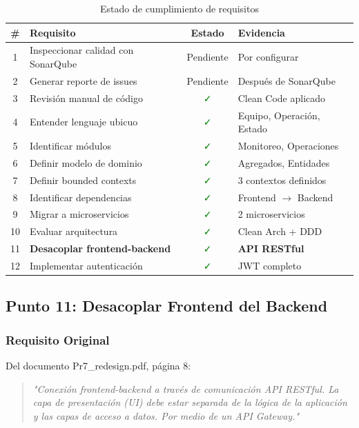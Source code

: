 \documentclass[12pt,a4paper]{article}
\begin{document}
\begin{table}[H]
\centering
\small
\begin{tabular}{|c|p{7cm}|c|p{4cm}|}
\hline
\textbf{\#} & \textbf{Requisito} & \textbf{Estado} & \textbf{Evidencia} \\
\hline
1 & Inspeccionar calidad con SonarQube & Pendiente & Por configurar \\
\hline
2 & Generar reporte de issues & Pendiente & Después de SonarQube \\
\hline
3 & Revisión manual de código & \textcolor{green}{✓} & Clean Code aplicado \\
\hline
4 & Entender lenguaje ubicuo & \textcolor{green}{✓} & Equipo, Operación, Estado \\
\hline
5 & Identificar módulos & \textcolor{green}{✓} & Monitoreo, Operaciones \\
\hline
6 & Definir modelo de dominio & \textcolor{green}{✓} & Agregados, Entidades \\
\hline
7 & Definir bounded contexts & \textcolor{green}{✓} & 3 contextos definidos \\
\hline
8 & Identificar dependencias & \textcolor{green}{✓} & Frontend $\rightarrow$ Backend \\
\hline
9 & Migrar a microservicios & \textcolor{green}{✓} & 2 microservicios \\
\hline
10 & Evaluar arquitectura & \textcolor{green}{✓} & Clean Arch + DDD \\
\hline
11 & \textbf{Desacoplar frontend-backend} & \textcolor{green}{✓} & \textbf{API RESTful} \\
\hline
12 & Implementar autenticación & \textcolor{green}{✓} & JWT completo \\
\hline
\end{tabular}
\caption{Estado de cumplimiento de requisitos}
\end{table}

\subsection{Punto 11: Desacoplar Frontend del Backend}

\subsubsection{Requisito Original}

Del documento Pr7\_redesign.pdf, página 8:

\begin{quote}
\textit{"Conexión frontend-backend a través de comunicación API RESTful. La capa de presentación (UI) debe estar separada de la lógica de la aplicación y las capas de acceso a datos. Por medio de un API Gateway."}
\end{quote}
\end{document}
